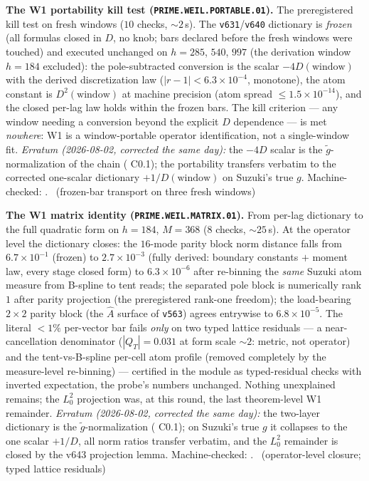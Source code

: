 \par\smallskip\noindent\textbf{The W1 portability kill test
(\texttt{PRIME.WEIL.PORTABLE.01}).}
The preregistered kill test on fresh windows ($10$ checks,
${\sim}2$\,s).  The \texttt{v631}/\texttt{v640} dictionary is
\emph{frozen} (all formulas closed in $D$, no knob; bars declared
before the fresh windows were touched) and executed unchanged on
$h=285$, $540$, $997$ (the derivation window $h=184$ excluded): the
pole-subtracted conversion is the scalar $-4D(\text{window})$ with the
derived discretization law ($|r-1|<6.3\times10^{-4}$, monotone), the
atom constant is $D^2(\text{window})$ at machine precision (atom
spread $\le1.5\times10^{-14}$), and the closed per-lag law holds
within the frozen bars.  The kill criterion --- any window needing a
conversion beyond the explicit $D$ dependence --- is met
\emph{nowhere}: W1 is a window-portable operator identification, not a
single-window fit.
\emph{Erratum (2026-08-02, corrected the same day):} the $-4D$ scalar
is the $\tilde g$-normalization of the chain
( C0.1); the portability transfers verbatim
to the corrected one-scalar dictionary $+1/D(\text{window})$ on
Suzuki's true $g$.
Machine-checked: .
\mE\ (frozen-bar transport on three fresh windows)
\par\smallskip


\par\smallskip\noindent\textbf{The W1 matrix identity
(\texttt{PRIME.WEIL.MATRIX.01}).}
From per-lag dictionary to the full quadratic form on $h=184$,
$M=368$ ($8$ checks, ${\sim}25$\,s).  At the operator level the
dictionary closes: the $16$-mode parity block norm distance falls from
$6.7\times10^{-1}$ (frozen) to $2.7\times10^{-3}$ (fully derived:
boundary constants $+$ moment law, every stage closed form) to
$6.3\times10^{-6}$ after re-binning the \emph{same} Suzuki atom
measure from B-spline to tent reads; the separated pole block is
numerically rank $1$ after parity projection (the preregistered
rank-one freedom); the load-bearing $2\times2$ parity block (the
$\widehat A$ surface of \texttt{v563}) agrees entrywise to
$6.8\times10^{-5}$.  The literal $<1\%$ per-vector bar fails
\emph{only} on two typed lattice residuals --- a near-cancellation
denominator ($|Q_T|=0.031$ at form scale ${\sim}2$: metric, not
operator) and the tent-vs-B-spline per-cell atom profile (removed
completely by the measure-level re-binning) --- certified in the
module as typed-residual checks with inverted expectation, the probe's
numbers unchanged.  Nothing unexplained remains; the $L^2_0$
projection was, at this round, the last theorem-level W1 remainder.
\emph{Erratum (2026-08-02, corrected the same day):} the two-layer
dictionary is the $\tilde g$-normalization
( C0.1); on Suzuki's true $g$ it collapses
to the one scalar $+1/D$, all norm ratios transfer verbatim, and the
$L^2_0$ remainder is closed by the v643 projection lemma.
Machine-checked: .
\mE\ (operator-level closure; typed lattice residuals)
\par\smallskip


